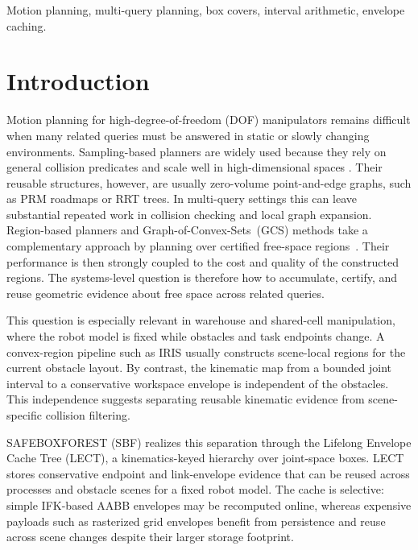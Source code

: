 \documentclass[journal]{IEEEtran}
\DeclareRobustCommand{\textsc}[1]{\textnormal{\MakeUppercase{#1}}}
\begin{document}
\begin{IEEEkeywords}
Motion planning, multi-query planning, box covers, interval arithmetic, envelope caching.
\end{IEEEkeywords}

\section{Introduction}\label{sec:intro}

Motion planning for high-degree-of-freedom (DOF) manipulators remains difficult
when many related queries must be answered in static or slowly changing
environments. Sampling-based planners are widely used because they rely on
general collision predicates and scale well in high-dimensional spaces
\cite{lavalle2006planning,lavalle1998rapidly,kavraki1996probabilistic,
karaman2011sampling}. Their reusable structures, however, are usually
zero-volume point-and-edge graphs, such as PRM roadmaps or RRT trees. In
multi-query settings this can leave substantial repeated work in collision
checking and local graph expansion. Region-based planners and
Graph-of-Convex-Sets~(GCS) methods take a complementary approach by planning
over certified free-space regions~\cite{deits2015computing,
marcucci2023motion,marcucci2024shortest}. Their performance is then strongly
coupled to the cost and quality of the constructed regions. The systems-level
question is therefore how to accumulate, certify, and reuse geometric evidence
about free space across related queries.

This question is especially relevant in warehouse and shared-cell manipulation,
where the robot model is fixed while obstacles and task endpoints change. A
convex-region pipeline such as IRIS usually constructs scene-local regions for
the current obstacle layout. By contrast, the kinematic map from a bounded
joint interval to a conservative workspace envelope is independent of the
obstacles. This independence suggests separating reusable kinematic evidence
from scene-specific collision filtering.

\textsc{SafeBoxForest} (SBF) realizes this separation through the Lifelong
Envelope Cache Tree (LECT), a kinematics-keyed hierarchy over joint-space
boxes. LECT stores conservative endpoint and link-envelope evidence that can
be reused across processes and obstacle scenes for a fixed robot model. The
cache is selective: simple IFK-based AABB envelopes may be recomputed online,
whereas expensive payloads such as rasterized grid envelopes benefit from
persistence and reuse across scene changes despite their larger storage
footprint.
\end{document}
